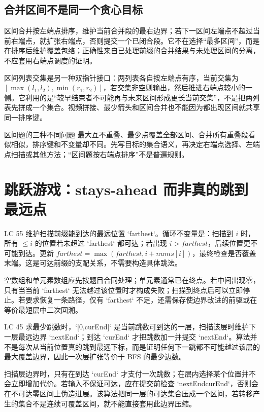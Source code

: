 \documentclass[UTF8,fontset=none,11pt,a4paper]{ctexart}
\begin{document}
\subsection{合并区间不是同一个贪心目标}

区间合并按左端点排序，维护当前合并段的最右边界；若下一区间左端点不超过当前右端点，就扩张右端点，否则提交一个已闭合段。它不在选择“最多区间”，而是在排序后维护覆盖包络；正确性来自已处理前缀的合并结果与未处理区间的分离，不应套用右端点调度的证明。

区间列表交集是另一种双指针接口：两列表各自按左端点有序，当前交集为 $[\max(l_1,l_2),\min(r_1,r_2)]$，若交集非空则输出，然后推进右端点较小的一侧。它利用的是“较早结束者不可能再与未来区间形成更长当前交集”，不是把两列表先拼成一个集合。视频拼接、最少箭头和区间合并也不能因为都出现区间就共享同一排序键。

\begin{warnbox}{区间题的三种不同问题}
最大互不重叠、最少点覆盖全部区间、合并所有重叠段看似相似，排序键和不变量却不同。先写目标的集合语义，再决定右端点选择、左端点扫描或其他方法；“区间题按右端点排序”不是普遍规则。
\end{warnbox}

\section{跳跃游戏：stays-ahead 而非真的跳到最远点}

LC 55 维护扫描前缀能到达的最远位置 `farthest`。循环不变量是：扫描到 $i$ 时，所有 $\le i$ 的位置若未超过 `farthest` 都可达；若出现 $i>farthest$，后续位置更不可能到达。更新 $farthest=\max(farthest,i+nums[i])$，最终检查是否覆盖末端。这是可达前缀的支配关系，不需要构造具体跳法。

空数组和单元素数组应先按题目合同处理；单元素通常已在终点。若中间出现零，只有当当前 `farthest` 无法越过该位置时才构成失败；扫描到终点后可以立即停止。若要求恢复一条路径，仅有 `farthest` 不足，还需保存使边界改进的前驱或在等价最短层中二次回溯。

LC 45 求最少跳数时，`[0,curEnd]` 是当前跳数可到达的一层，扫描该层时维护下一层最远边界 `nextEnd`；到达 `curEnd` 才把跳数加一并提交 `nextEnd`。算法并不是每次从当前位置真的跳到最远下标，而是证明任何下一跳都不可能越过该层的最大覆盖边界，因此一次层扩张等价于 BFS 的最少边数。

扫描层边界时，只有在到达 `curEnd` 才支付一次跳数；在层内选择某个位置并不会立即增加代价。若输入不保证可达，应在提交前检查 `nextEnd\le curEnd`，否则会在不可达零区间上伪造进展。该算法把同一层的可达集合压成一个区间，若转移产生的集合不是连续可覆盖区间，就不能直接套用此边界压缩。
\end{document}
